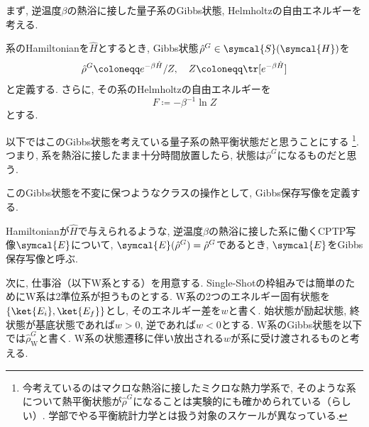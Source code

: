 
まず, 逆温度$\beta$の熱浴に接した量子系のGibbs状態, Helmholtzの自由エネルギーを考える. 
\begin{mydfn}\label{dfn.Gibbs-state_Free-energy}
  系のHamiltonianを$\hat{H}$とするとき, Gibbs状態$\hat{\rho}^G\in\symcal{S}(\symcal{H})$を
  \begin{equation}
    \hat{\rho}^G\coloneqq e^{-\beta\hat{H}}/Z, \quad  Z\coloneqq \tr[e^{-\beta\hat{H}}]
  \end{equation}
  と定義する. 
  さらに, その系のHelmholtzの自由エネルギーを
  \begin{equation}
    F\coloneqq -\beta^{-1}\ln{Z}
  \end{equation}
  とする. 
\end{mydfn}
以下ではこのGibbs状態を考えている量子系の熱平衡状態だと思うことにする
\footnote{今考えているのはマクロな熱浴に接したミクロな熱力学系で, そのような系について熱平衡状態が$\hat{\rho}^G$になることは実験的にも確かめられている（らしい）\cite{SagawaSaizensen}. 学部でやる平衡統計力学とは扱う対象のスケールが異なっている. }. 
つまり, 系を熱浴に接したまま十分時間放置したら, 状態は$\hat{\rho}^{G}$になるものだと思う.  

このGibbs状態を不変に保つようなクラスの操作として, Gibbs保存写像を定義する. 
\begin{mydfn}[Gibbs保存写像]
  Hamiltonianが$\hat{H}$で与えられるような, 逆温度$\beta$の熱浴に接した系に働くCPTP写像$\symcal{E}$について, $\symcal{E}(\hat{\rho}^G)=\hat{\rho}^G$であるとき, $\symcal{E}$をGibbs保存写像と呼ぶ. 
\end{mydfn}

次に, 仕事浴（以下W系とする）を用意する. 
Single-Shotの枠組みでは簡単のためにW系は2準位系が担うものとする. 
W系の2つのエネルギー固有状態を$\{\ket{E_i}, \ket{E_f}\}$とし, そのエネルギー差を$w$と書く. 
始状態が励起状態, 終状態が基底状態であれば$w>0$, 逆であれば$w<0$とする. 
W系のGibbs状態を以下では$\hat{\rho}_{\text{W}}^{G}$と書く. 
W系の状態遷移に伴い放出される$w$が系に受け渡されるものと考える. 

